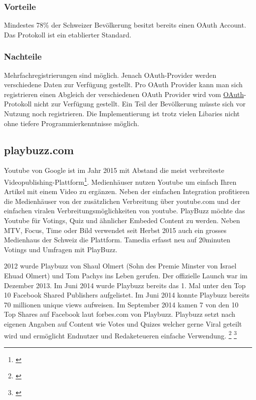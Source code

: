 \newpage

\subsubsection{Vorteile}\label{vorteile}

Mindestes 78\% der Schweizer Bevölkerung besitzt bereits einen OAuth
Account. Das Protokoll ist ein etablierter Standard.

\subsubsection{Nachteile}\label{nachteile}

Mehrfachregistrierungen sind möglich. Jenach OAuth-Provider werden
verschiedene Daten zur Verfügung gestellt. Pro OAuth Provider kann man
sich registrieren einen Abgleich der verschiedenen OAuth Provider wird
vom \protect\hyperlink{oauth}{OAuth}-Protokoll nicht zur Verfügung
gestellt. Ein Teil der Bevölkerung müsste sich vor Nutzung noch
registrieren. Die Implementierung ist trotz vielen Libaries nicht ohne
tiefere Programmierkenntnisse möglich.

\newpage

\subsection{playbuzz.com}\label{playbuzz.com}

Youtube von Google ist im Jahr 2015 mit Abstand die meist verbreiteste
Videopublishing-Plattform\footnote{\autocite{statista}}. Medienhäuser
nutzen Youtube um einfach Ihren Artikel mit einem Video zu ergänzen.
Neben der einfachen Integration profitieren die Medienhäuser von der
zusätzlichen Verbreitung über youtube.com und der einfachen viralen
Verbreitungsmöglichkeiten von youtube. PlayBuzz möchte das Youtube für
Votings, Quiz und ähnlicher Embeded Content zu werden. Neben MTV, Focus,
Time oder Bild verwendet seit Herbst 2015 auch ein grosses Medienhaus
der Schweiz die Plattform. Tamedia erfasst neu auf 20minuten Votings und
Umfragen mit PlayBuzz.

2012 wurde Playbuzz von Shaul Olmert (Sohn des Premie Minster von Israel
Ehuad Olmert) und Tom Pachys ins Leben gerufen. Der offizielle Launch
war im Dezember 2013. Im Juni 2014 wurde Playbuzz bereits das 1. Mal
unter den Top 10 Facebook Shared Publishers aufgelistet. Im Juni 2014
konnte Playbuzz bereits 70 millionen unique views aufweisen. Im
September 2014 kamen 7 von den 10 Top Shares auf Facebook laut
forbes.com von Playbuzz. Playbuzz setzt nach eigenen Angaben auf Content
wie Votes und Quizes welcher gerne Viral geteilt wird und ermöglicht
Endnutzer und Redaketeueren einfache Verwendung. \footnote{\autocite{t3nplaybuzz}}
\footnote{\autocite{playbuzz}}

